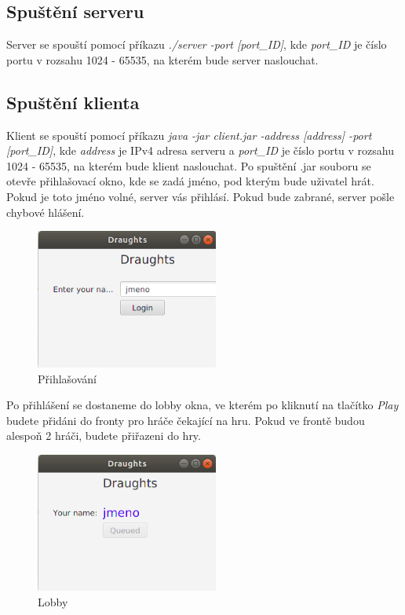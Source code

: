 \documentclass[12pt, a4paper]{article}
\begin{document}
\subsection{Spuštění serveru}
\label{Spuštění_serveru}
Server se spouští pomocí příkazu \textit{./server -port [port\_ID]}, kde \textit{port\_ID} je číslo portu v rozsahu 1024 - 65535, na kterém bude server naslouchat.
\subsection{Spuštění klienta}
\label{Spuštění_klienta}
Klient se spouští pomocí příkazu \textit{java -jar client.jar -address [address] -port [port\_ID]}, kde \textit{address} je IPv4 adresa serveru a \textit{port\_ID} je číslo portu v rozsahu 1024 - 65535, na kterém bude klient naslouchat.
\newline
Po spuštění .jar souboru se otevře přihlašovací okno, kde se zadá jméno, pod kterým bude uživatel hrát. Pokud je toto jméno volné, server vás přihlásí. Pokud bude zabrané, server pošle chybové hlášení.
\begin {figure}[h]
\centering
\includegraphics[width=6cm]{img/login}
\caption{Přihlašování}
\label{fig:login}
\end {figure}
\newline
Po přihlášení se dostaneme do lobby okna, ve kterém po kliknutí na tlačítko \textit{Play} budete přidáni do fronty pro hráče čekající na hru. Pokud ve frontě budou alespoň 2 hráči, budete přiřazeni do hry.
\begin {figure}[h]
\centering
\includegraphics[width=6cm]{img/lobby}
\caption{Lobby}
\label{fig:lobby}
\end {figure}
\end{document}
